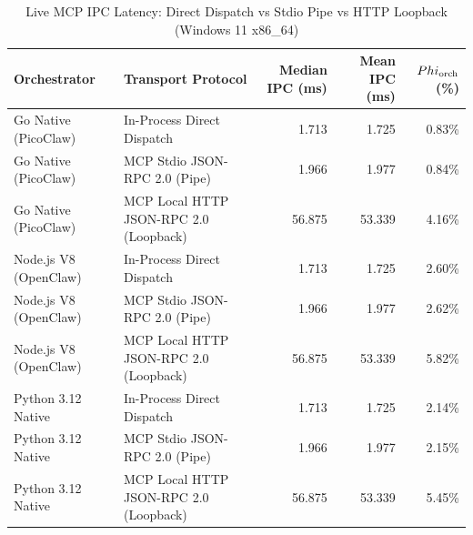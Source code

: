 \begin{table}[t]
\centering\small
\caption{Live MCP IPC Latency: Direct Dispatch vs Stdio Pipe vs HTTP Loopback (Windows 11 x86_64)}
\label{tab:Windows_mcp_transport}
\begin{tabular}{llrrr}
\toprule
Orchestrator & Transport Protocol & Median IPC (ms) & Mean IPC (ms) & $\\Phi_{\text{orch}}$ (\%) \\
\midrule
Go Native (PicoClaw) & In-Process Direct Dispatch & 1.713 & 1.725 & 0.83\% \\
Go Native (PicoClaw) & MCP Stdio JSON-RPC 2.0 (Pipe) & 1.966 & 1.977 & 0.84\% \\
Go Native (PicoClaw) & MCP Local HTTP JSON-RPC 2.0 (Loopback) & 56.875 & 53.339 & 4.16\% \\
Node.js V8 (OpenClaw) & In-Process Direct Dispatch & 1.713 & 1.725 & 2.60\% \\
Node.js V8 (OpenClaw) & MCP Stdio JSON-RPC 2.0 (Pipe) & 1.966 & 1.977 & 2.62\% \\
Node.js V8 (OpenClaw) & MCP Local HTTP JSON-RPC 2.0 (Loopback) & 56.875 & 53.339 & 5.82\% \\
Python 3.12 Native & In-Process Direct Dispatch & 1.713 & 1.725 & 2.14\% \\
Python 3.12 Native & MCP Stdio JSON-RPC 2.0 (Pipe) & 1.966 & 1.977 & 2.15\% \\
Python 3.12 Native & MCP Local HTTP JSON-RPC 2.0 (Loopback) & 56.875 & 53.339 & 5.45\% \\
\bottomrule
\end{tabular}
\end{table}
